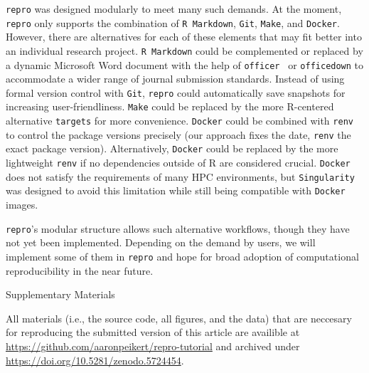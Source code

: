 \documentclass[psych,tutorial,accept,moreauthors,pdftex]{Definitions/mdpi}
\begin{document}
\begin{paracol}{2}
\texttt{repro} was designed modularly to meet many such demands. At the
moment, \texttt{repro} only supports the combination of
\texttt{R\ Markdown}, \texttt{Git}, \texttt{Make}, and \texttt{Docker}.
However, there are alternatives for each of these elements that may fit
better into an individual research project. \texttt{R\ Markdown} could
be complemented or replaced by a dynamic Microsoft Word document with
the help of \texttt{officer}~\citep{officer} or \texttt{officedown}
\citep{officedown} to accommodate a wider range of journal submission
standards. Instead of using formal version control with \texttt{Git},
\texttt{repro} could automatically save snapshots for increasing
user-friendliness. \texttt{Make} could be replaced by the more
R-centered alternative \texttt{targets} for more convenience.
\texttt{Docker} could be combined with \texttt{renv}~\citep{R-renv} to
control the package versions precisely (our approach fixes the date,
\texttt{renv} the exact package version). Alternatively, \texttt{Docker}
could be replaced by the more lightweight \texttt{renv} if no
dependencies outside of R are considered crucial. \texttt{Docker} does
not satisfy the requirements of many HPC environments, but
\texttt{Singularity} was designed to avoid this limitation while still
being compatible with \texttt{Docker} images.

\texttt{repro}'s modular structure allows such alternative workflows,
though they have not yet been implemented. Depending on the demand by
users, we will implement some of them in \texttt{repro} and hope for
broad adoption of computational reproducibility in the near future.



\vspace{6pt}

Supplementary Materials{All materials (i.e., the source code, all figures, and the data) that are neccesary for reproducing the submitted version of this article are availible at \url{https://github.com/aaronpeikert/repro-tutorial} and archived under \url{https://doi.org/10.5281/zenodo.5724454}.



}
\end{paracol}
\end{document}
